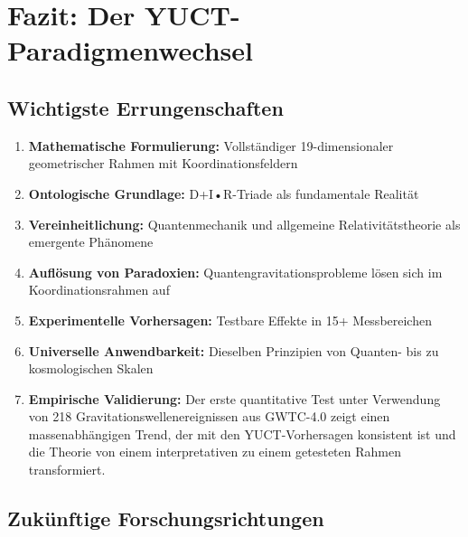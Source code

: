 \documentclass[12pt,a4paper]{article}
\theoremstyle{remark}
\begin{document}
	\section{Fazit: Der YUCT-Paradigmenwechsel}
	\label{sec:conclusion}
	
	\subsection{Wichtigste Errungenschaften}
	
	\begin{enumerate}
		\item \textbf{Mathematische Formulierung:} Vollständiger 19-dimensionaler geometrischer Rahmen mit Koordinationsfeldern
		
		\item \textbf{Ontologische Grundlage:} D+I•R-Triade als fundamentale Realität
		
		\item \textbf{Vereinheitlichung:} Quantenmechanik und allgemeine Relativitätstheorie als emergente Phänomene
		
		\item \textbf{Auflösung von Paradoxien:} Quantengravitationsprobleme lösen sich im Koordinationsrahmen auf
		
		\item \textbf{Experimentelle Vorhersagen:} Testbare Effekte in 15+ Messbereichen
		
		\item \textbf{Universelle Anwendbarkeit:} Dieselben Prinzipien von Quanten- bis zu kosmologischen Skalen
		
		\item \textbf{Empirische Validierung:} Der erste quantitative Test unter Verwendung von 218 Gravitationswellenereignissen aus GWTC-4.0 zeigt einen massenabhängigen Trend, der mit den YUCT-Vorhersagen konsistent ist und die Theorie von einem interpretativen zu einem getesteten Rahmen transformiert.
	\end{enumerate}
	
	\subsection{Zukünftige Forschungsrichtungen}
	
\end{document}
